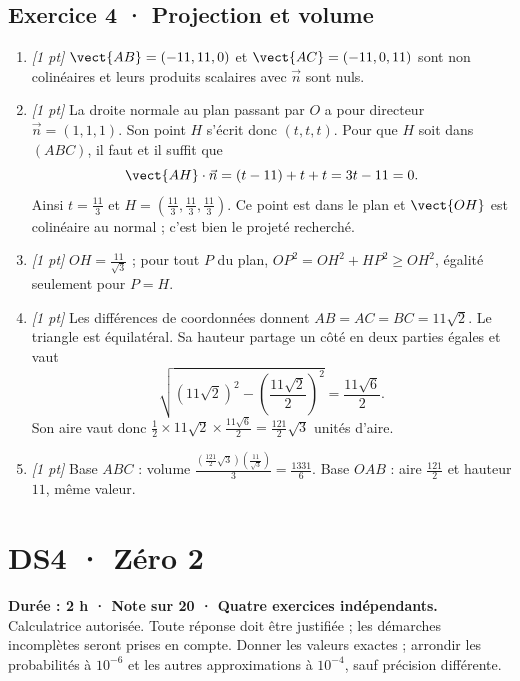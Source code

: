 \subsection*{Exercice 4 · Projection et volume}\begin{enumerate}

\item \textit{[1 pt]} $\vect{AB}=(-11,11,0)$ et $\vect{AC}=(-11,0,11)$ sont non colinéaires et leurs produits scalaires avec $\vec n$ sont nuls.

\item \textit{[1 pt]} La droite normale au plan passant par $O$ a pour directeur $\vec n=(1,1,1)$. Son point $H$ s'écrit donc $(t,t,t)$. Pour que $H$ soit dans $(ABC)$, il faut et il suffit que
\[\vect{AH}\cdot\vec n=(t-11)+t+t=3t-11=0.\]
Ainsi $t=\frac{11}{3}$ et $H=(\frac{11}{3},\frac{11}{3},\frac{11}{3})$. Ce point est dans le plan et $\vect{OH}$ est colinéaire au normal ; c'est bien le projeté recherché.

\item \textit{[1 pt]} $OH=\frac{11}{\sqrt{3}}$ ; pour tout $P$ du plan, $OP^2=OH^2+HP^2\ge OH^2$, égalité seulement pour $P=H$.

\item \textit{[1 pt]} Les différences de coordonnées donnent $AB=AC=BC=11\sqrt2$. Le triangle est équilatéral. Sa hauteur partage un côté en deux parties égales et vaut
\[\sqrt{(11\sqrt2)^2-(\frac{11\sqrt{2}}{2})^2}=\frac{11\sqrt6}{2}.\]
Son aire vaut donc $\frac12\times 11\sqrt2\times\frac{11\sqrt6}{2}=\frac{121}{2}\sqrt3$ unités d'aire.

\item \textit{[1 pt]} Base $ABC$ : volume $\frac{(\frac{121}{2}\sqrt3)(\frac{11}{\sqrt{3}})}{3}=\frac{1331}{6}$. Base $OAB$ : aire $\frac{121}{2}$ et hauteur $11$, même valeur.

\end{enumerate}

\fi

\mxnewpage{}\label{sujet:6-2}

\section*{DS4 · Zéro 2}


\textbf{Durée : 2 h · Note sur 20 · Quatre exercices indépendants.}\\Calculatrice autorisée. Toute réponse doit être justifiée ; les démarches incomplètes seront prises en compte. Donner les valeurs exactes ; arrondir les probabilités à $10^{-6}$ et les autres approximations à $10^{-4}$, sauf précision différente.

